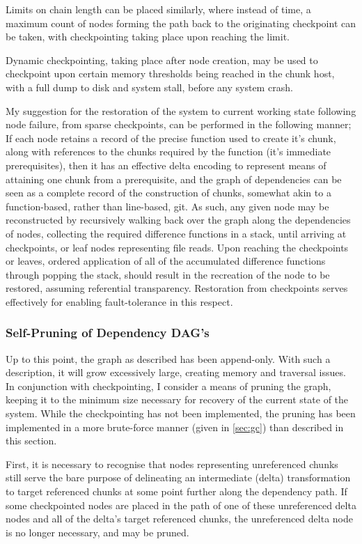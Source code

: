 Limits on chain length can be placed similarly, where instead of time, a maximum count of nodes forming the path back to the originating checkpoint can be taken, with checkpointing taking place upon reaching the limit.

Dynamic checkpointing, taking place after node creation, may be used to checkpoint upon certain memory thresholds being reached in the chunk host, with a full dump to disk and system stall, before any system crash.

My suggestion for the restoration of the system to current working state following node failure, from sparse checkpoints, can be performed in the following manner;
If each node retains a record of the precise function used to create it's chunk, along with references to the chunks required by the function (it's immediate prerequisites), then it has an effective delta encoding to represent means of attaining one chunk from a prerequisite, and the graph of dependencies can be seen as a complete record of the construction of chunks, somewhat akin to a function-based, rather than line-based, git\cite{chacon2014progit}.
As such, any given node may be reconstructed by recursively walking back over the graph along the dependencies of nodes, collecting the required difference functions in a stack, until arriving at checkpoints, or leaf nodes representing file reads.
Upon reaching the checkpoints or leaves, ordered application of all of the accumulated difference functions through popping the stack, should result in the recreation of the node to be restored, assuming referential transparency.
Restoration from checkpoints serves effectively for enabling fault-tolerance in this respect.

\subsubsection{Self-Pruning of Dependency DAG's}

Up to this point, the graph as described has been append-only.
With such a description, it will grow excessively large, creating memory and traversal issues.
In conjunction with checkpointing, I consider a means of pruning the graph, keeping it to the minimum size necessary for recovery of the current state of the system.
While the checkpointing has not been implemented, the pruning has been implemented in a more brute-force manner (given in \cref{sec:gc}) than described in this section.

First, it is necessary to recognise that nodes representing unreferenced chunks still serve the bare purpose of delineating an intermediate (delta) transformation to target referenced chunks at some point further along the dependency path\cite{mogul2002deltahttp}.
If some checkpointed nodes are placed in the path of one of these unreferenced delta nodes and all of the delta's target referenced chunks, the unreferenced delta node is no longer necessary, and may be pruned.

